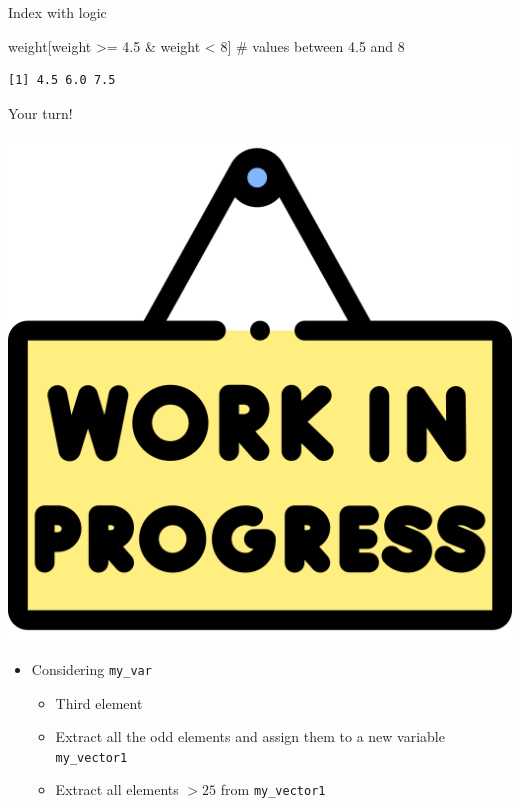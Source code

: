 \documentclass[
  ignorenonframetext,
]{beamer}
\newenvironment{Shaded}{\begin{snugshade}}{\end{snugshade}}
\newcommand{\CommentTok}[1]{\textcolor[rgb]{0.54,0.53,0.53}{#1}}
\newcommand{\DecValTok}[1]{\textcolor[rgb]{0.69,0.50,0.00}{#1}}
\newcommand{\FloatTok}[1]{\textcolor[rgb]{0.69,0.50,0.00}{#1}}
\newcommand{\NormalTok}[1]{\textcolor[rgb]{0.12,0.11,0.11}{#1}}
\newcommand{\SpecialCharTok}[1]{\textcolor[rgb]{0.24,0.68,0.91}{#1}}
\providecommand{\tightlist}{%
  \setlength{\itemsep}{0pt}\setlength{\parskip}{0pt}}
\begin{document}
\begin{frame}[fragile]{Index with logic}
\begin{Shaded}
\begin{Highlighting}[]
\NormalTok{weight[weight }\SpecialCharTok{\textgreater{}=} \FloatTok{4.5} \SpecialCharTok{\&}\NormalTok{ weight }\SpecialCharTok{\textless{}} \DecValTok{8}\NormalTok{] }\CommentTok{\# values between 4.5 and 8}
\end{Highlighting}
\end{Shaded}

\begin{verbatim}
[1] 4.5 6.0 7.5
\end{verbatim}
\end{frame}

\begin{frame}[fragile]{Your turn!}
\protect\hypertarget{your-turn-2}{}
\begin{center}\includegraphics[width=0.1\linewidth]{img/work} \end{center}

\begin{itemize}
\tightlist
\item
  Considering \texttt{my\_var}

  \begin{itemize}
  \tightlist
  \item
    Third element
  \item
    Extract all the odd elements and assign them to a new variable
    \texttt{my\_vector1}
  \item
    Extract all elements \(> 25\) from \texttt{my\_vector1}
  \end{itemize}
\end{itemize}
\end{frame}
\end{document}
